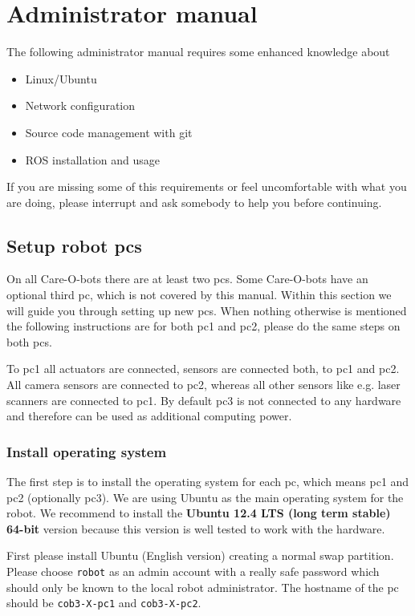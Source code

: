 \chapter{Administrator manual}
\label{chap:admin}

The following administrator manual requires some enhanced knowledge about
\begin{itemize}
\item Linux/Ubuntu
\item Network configuration
\item Source code management with git
\item ROS installation and usage
\end{itemize}
If you are missing some of this requirements or feel uncomfortable with what you are doing, please interrupt and ask somebody to help you before continuing.

\section{Setup robot pcs}
On all Care-O-bots there are at least two pcs. Some Care-O-bots have an optional third pc, which is not covered by this manual. Within this section we will guide you through setting up new pcs. When nothing otherwise is mentioned the following instructions are for both pc1 and pc2, please do the same steps on both pcs.

To pc1 all actuators are connected, sensors are connected both, to pc1 and pc2. All camera sensors are connected to pc2, whereas all other sensors like e.g. laser scanners are connected to pc1. By default pc3 is not connected to any hardware and therefore can be used as additional computing power.

\subsection{Install operating system}
The first step is to install the operating system for each pc, which means pc1 and pc2 (optionally pc3). We are using Ubuntu as the main operating system for the robot. We recommend to install the \textbf{Ubuntu 12.4 LTS (long term stable) 64-bit} version because this version is well tested to work with the hardware. 

First please install Ubuntu (English version) creating a normal swap partition. Please choose \texttt{robot} as an admin account with a really safe password which should only be known to the local robot administrator. The hostname of the pc should be \texttt{cob3-X-pc1} and \texttt{cob3-X-pc2}.


